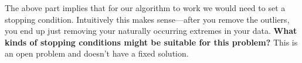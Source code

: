 \begin{enumerate}





\qitem
  The above part implies that for our algorithm to work we would need to set a stopping condition. Intuitively this makes sense---after you remove the outliers, you end up just removing your naturally occurring extremes in your data. {\bf What kinds of stopping conditions might be suitable for this problem?} This is an open problem and doesn't have a fixed solution. 

  


\end{enumerate}
